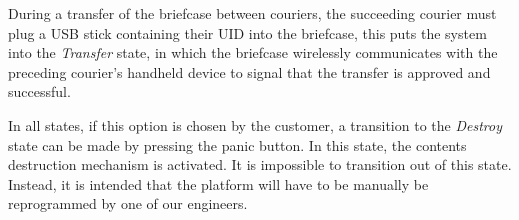 During a transfer of the briefcase between couriers, the succeeding courier must plug a USB stick containing their UID into the briefcase, this puts the system into the \textit{Transfer} state, in which the briefcase wirelessly communicates with the preceding courier's handheld device to signal that the transfer is approved and successful.

In all states, if this option is chosen by the customer, a transition to the \textit{Destroy} state can be made by pressing the  panic button. In this state, the contents destruction mechanism is activated. It is impossible to transition out of this state. Instead, it is intended that the platform will have to be manually be reprogrammed by one of our engineers. 